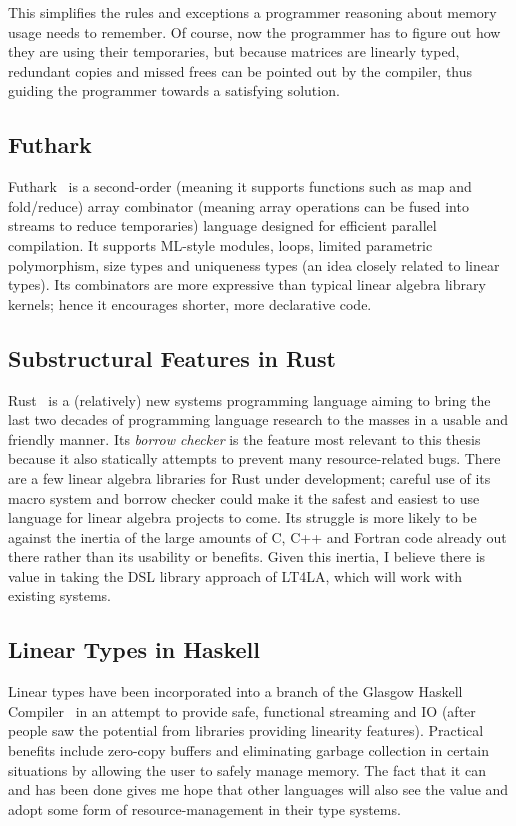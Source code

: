 This simplifies the rules and exceptions a programmer reasoning about memory
usage needs to remember. Of course, now the programmer has to figure out how
they are using their temporaries, but because matrices are linearly typed,
redundant copies and missed frees can be pointed out by the compiler, thus
guiding the programmer towards a satisfying solution.

\subsection{Futhark}

Futhark~\cite{futhark} is a second-order (meaning it supports functions such as
map and fold/reduce) array combinator (meaning array operations can be fused
into streams to reduce temporaries) language designed for efficient parallel
compilation. It supports ML-style modules, loops, limited parametric
polymorphism, size types and uniqueness types (an idea closely related to
linear types). Its combinators are more expressive than typical linear algebra
library kernels; hence it encourages shorter, more declarative code.

\subsection{Substructural Features in Rust}

Rust~\cite{rust} is a (relatively) new systems programming language aiming to
bring the last two decades of programming language research to the masses in a
usable and friendly manner. Its \emph{borrow checker} is the feature most
relevant to this thesis because it also statically attempts to prevent many
resource-related bugs. There are a few linear algebra libraries for
Rust under development; careful use of its macro system and borrow checker
could make it the safest and easiest to use language for linear algebra
projects to come. Its struggle is more likely to be against the inertia of the
large amounts of C, C++ and Fortran code already out there rather than its
usability or benefits. Given this inertia, I believe there is value in taking
the DSL library approach of LT4LA, which will work with existing systems.

\subsection{Linear Types in Haskell}

Linear types have been incorporated into a branch of the Glasgow Haskell
Compiler~\cite{retrofitting} in an attempt to provide safe, functional
streaming and IO (after people saw the potential from libraries providing
linearity features). Practical benefits include zero-copy buffers and
eliminating garbage collection in certain situations by allowing the user to
safely manage memory. The fact that it can and has been done gives me hope that
other languages will also see the value and adopt some form of
resource-management in their type systems.

